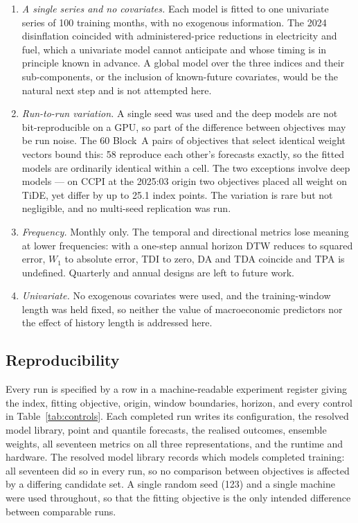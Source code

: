 \documentclass[12pt]{article}
\begin{document}
\begin{enumerate}
          close on validation, the composition reported in
          Table~\ref{tab:shortlist} is one of several that the procedure could
          have produced.
    \item \emph{A single series and no covariates.} Each model is fitted to
          one univariate series of 100 training months, with no exogenous
          information. The 2024 disinflation coincided with administered-price
          reductions in electricity and fuel, which a univariate model cannot
          anticipate and whose timing is in principle known in advance. A
          global model over the three indices and their sub-components, or the
          inclusion of known-future covariates, would be the natural next step
          and is not attempted here.
    \item \emph{Run-to-run variation.} A single seed was used and the deep
          models are not bit-reproducible on a GPU, so part of the difference
          between objectives may be run noise. The 60 Block~A pairs of
          objectives that select identical weight vectors bound this: 58
          reproduce each other's forecasts exactly, so the fitted models are
          ordinarily identical within a cell. The two exceptions involve deep
          models --- on CCPI at the 2025:03 origin two objectives placed all weight
          on TiDE, yet differ by up to 25.1 index points. The variation is rare
          but not negligible, and no multi-seed replication was run.
    \item \emph{Frequency.} Monthly only. The temporal and directional metrics
          lose meaning at lower frequencies: with a one-step annual horizon DTW
          reduces to squared error, $W_1$ to absolute error, TDI to zero, DA and
          TDA coincide and TPA is undefined. Quarterly and annual designs are
          left to future work.
    \item \emph{Univariate.} No exogenous covariates were used, and the
          training-window length was held fixed, so neither the value of
          macroeconomic predictors nor the effect of history length is
          addressed here.
\end{enumerate}

\subsection{Reproducibility}
\label{sec:method-implementation}

Every run is specified by a row in a machine-readable experiment register
giving the index, fitting objective, origin, window boundaries, horizon, and
every control in Table~\ref{tab:controls}. Each completed run writes its
configuration, the resolved model library, point and quantile forecasts, the
realised outcomes, ensemble weights, all seventeen metrics on all three
representations, and the runtime and hardware. The resolved model library
records which models completed training: all seventeen did so in every run, so
no comparison between objectives is affected by a differing candidate set. A
single random seed (123) and a single machine were used throughout, so that the
fitting objective is the only intended difference between comparable runs.
\end{document}
